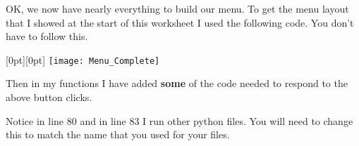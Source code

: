 \documentclass{coderdojo}
\begin{document}
OK, we now have nearly everything to build our menu. To get the menu layout that I showed at the start of this worksheet I used the following code.  You don't have to follow this.

\mbox{}\hfill\raisebox{7cm}[0pt][0pt]{%
	\texttt{[image: Menu\_Complete]}
}\hspace*{-1.5cm}

Then in my  functions I have added {\bf some} of the code needed to respond to the above button clicks.
 

Notice in line 80 and in line 83 I run other python files.  You will need to change this to match the name that you used for your files.
\end{document}
